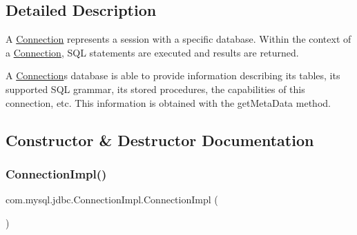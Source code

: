 \subsection{Detailed Description}
A \mbox{\hyperlink{interfacecom_1_1mysql_1_1jdbc_1_1_connection}{Connection}} represents a session with a specific database. Within the context of a \mbox{\hyperlink{interfacecom_1_1mysql_1_1jdbc_1_1_connection}{Connection}}, S\+QL statements are executed and results are returned.

A \mbox{\hyperlink{interfacecom_1_1mysql_1_1jdbc_1_1_connection}{Connection}}\textquotesingle{}s database is able to provide information describing its tables, its supported S\+QL grammar, its stored procedures, the capabilities of this connection, etc. This information is obtained with the get\+Meta\+Data method. 

\subsection{Constructor \& Destructor Documentation}
\mbox{\label{classcom_1_1mysql_1_1jdbc_1_1_connection_impl_a3c11700ec151a1a13a2696b407161a34}} 
\subsubsection{\texorpdfstring{Connection\+Impl()}{ConnectionImpl()}\hspace{0.1cm}{\footnotesize\ttfamily [1/2]}}
{\footnotesize\ttfamily com.\+mysql.\+jdbc.\+Connection\+Impl.\+Connection\+Impl (\begin{DoxyParamCaption}{ }\end{DoxyParamCaption})\hspace{0.3cm}{\ttfamily [protected]}}

